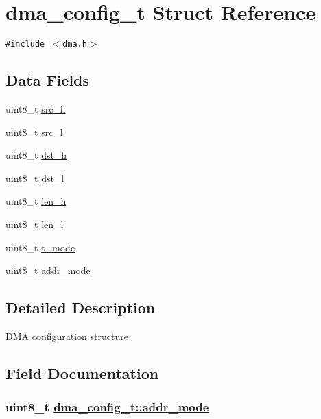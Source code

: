 \hypertarget{structdma__config__t}{
\section{dma\_\-config\_\-t Struct Reference}
\label{structdma__config__t}
}
{\tt \#include $<$dma.h$>$}

\subsection*{Data Fields}
\begin{CompactItemize}
\item 
uint8\_\-t \hyperlink{structdma__config__t_fb5908c7e14524a97700beaccd97ba53}{src\_\-h}
\item 
uint8\_\-t \hyperlink{structdma__config__t_df559811e53bbde7b6dc8cc6abb17e87}{src\_\-l}
\item 
uint8\_\-t \hyperlink{structdma__config__t_528a6d47caadb8b50b6bfa73444fb711}{dst\_\-h}
\item 
uint8\_\-t \hyperlink{structdma__config__t_ba26fe8bc8fc23929a766db7afe2e082}{dst\_\-l}
\item 
uint8\_\-t \hyperlink{structdma__config__t_c28c429f8e8b40eb50daf4994ecdf056}{len\_\-h}
\item 
uint8\_\-t \hyperlink{structdma__config__t_a4bfe298c22cedde28a40bd00d1db608}{len\_\-l}
\item 
uint8\_\-t \hyperlink{structdma__config__t_e41c35fc1ca1e6b7ddace92021656e4f}{t\_\-mode}
\item 
uint8\_\-t \hyperlink{structdma__config__t_ad91fc2dadb15a7a368fa2731f4a0e8b}{addr\_\-mode}
\end{CompactItemize}


\subsection{Detailed Description}
DMA configuration structure 



\subsection{Field Documentation}
\hypertarget{structdma__config__t_ad91fc2dadb15a7a368fa2731f4a0e8b}{
\subsubsection[addr\_\-mode]{\setlength{\rightskip}{0pt plus 5cm}uint8\_\-t \hyperlink{structdma__config__t_ad91fc2dadb15a7a368fa2731f4a0e8b}{dma\_\-config\_\-t::addr\_\-mode}}}
\label{structdma__config__t_ad91fc2dadb15a7a368fa2731f4a0e8b}



